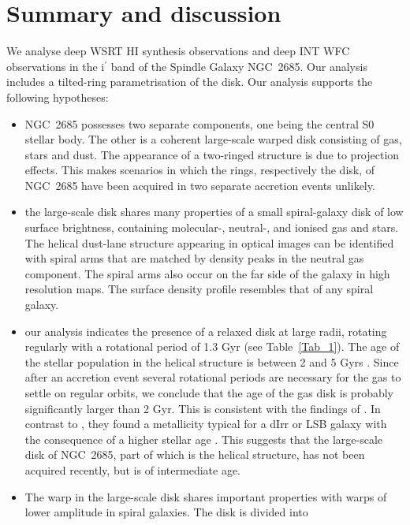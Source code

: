 \documentclass[oldversion]{aa}
\begin{document}
\section{Summary and discussion}
\label{Sect_10}
We analyse deep WSRT HI synthesis observations and deep INT WFC
observations in the i$^\prime$ band of the Spindle Galaxy
NGC~2685. Our analysis includes a tilted-ring parametrisation of the
 disk. Our analysis 
supports the following
hypotheses:
\begin{itemize}
\item{
NGC~2685 possesses two separate components, one being the central S0
stellar body. The other is a coherent large-scale warped disk
consisting of gas, stars and dust. The appearance of a two-ringed
structure \citep[][]{Shane77,Shane80,Mahon92,Schinnerer02} 
is due to
projection effects. This makes scenarios in which the rings,
respectively the disk, of NGC~2685 have been acquired in two separate
accretion events unlikely.
}
\item{
the large-scale disk shares many properties of a small spiral-galaxy
disk of low surface brightness, containing molecular-, neutral-, and
ionised gas and stars. The helical dust-lane structure appearing in
optical images can be identified with spiral arms that are matched by
density peaks in the neutral gas component. The spiral arms also occur
on the far side of the galaxy in high resolution  maps.  The
 surface density profile resembles that of any spiral
galaxy.
}
\item{
our analysis indicates the presence of a relaxed  disk at
large radii, rotating regularly with a rotational period of 1.3 Gyr
(see Table~\ref{Tab_1}). The age of the stellar population in the
helical structure is between 2 and 5 Gyrs
\citep[][]{Peletier93,Eskridge97,Karataeva04}. Since after an
accretion event several rotational periods are necessary for the gas
to settle on regular orbits, we conclude that the age of the gas disk
is probably significantly larger than 2 Gyr. This is consistent with
the findings of \citet[][]{Karataeva04}. In contrast to
\citet[][]{Eskridge97}, they found a metallicity typical for a dIrr or
LSB galaxy with the consequence of a higher stellar age
\citep[][]{Peletier93}. This suggests that the large-scale disk of
NGC~2685, part of which is the helical structure, has not been
acquired recently, but is of intermediate age.
}
\item{
The warp in the large-scale disk shares important properties with
warps of lower amplitude in spiral galaxies. The disk is divided into
}
\end{itemize}
\end{document}
